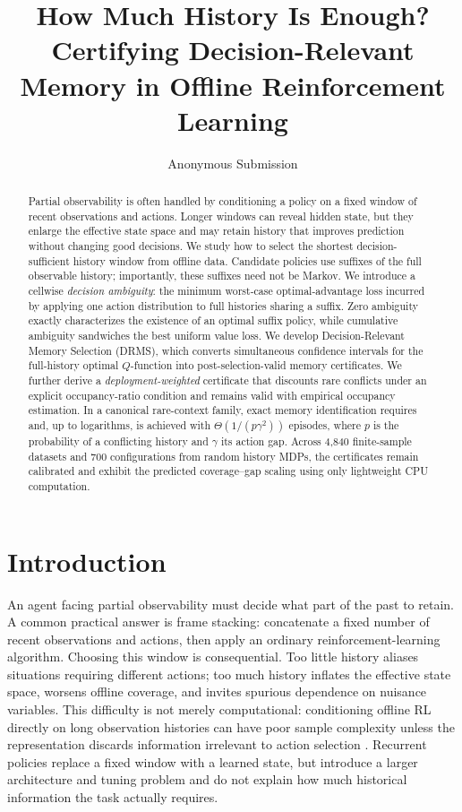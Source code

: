 \documentclass[letterpaper]{article} %
\title{How Much History Is Enough?\\
Certifying Decision-Relevant Memory in Offline Reinforcement Learning}
\author{Anonymous Submission}
\theoremstyle{remark}
\newcommand{\DRMS}{\textnormal{\textsc{DRMS}}}
\begin{document}
\maketitle

\begin{abstract}
Partial observability is often handled by conditioning a policy on a fixed
window of recent observations and actions. Longer windows can reveal hidden
state, but they enlarge the effective state space and may retain history that
improves prediction without changing good decisions. We study how to select
the shortest decision-sufficient history window from offline data. Candidate
policies use suffixes of the full observable history; importantly, these
suffixes need not be Markov. We introduce a cellwise \emph{decision ambiguity}:
the minimum worst-case optimal-advantage loss incurred by applying one action
distribution to full histories sharing a suffix. Zero ambiguity exactly
characterizes the existence of an optimal suffix policy, while cumulative
ambiguity sandwiches the best uniform value loss. We develop
Decision-Relevant Memory Selection (\DRMS), which converts simultaneous
confidence intervals for the full-history optimal $Q$-function into
post-selection-valid memory certificates. We further derive a
\emph{deployment-weighted} certificate that discounts rare conflicts under an
explicit occupancy-ratio condition and remains valid with empirical occupancy
estimation. In a canonical rare-context family, exact memory identification
requires and, up to logarithms, is achieved with
$\Theta(1/(p\gamma^2))$ episodes, where $p$ is the probability of a
conflicting history and $\gamma$ its action gap. Across 4,840 finite-sample
datasets and 700 configurations from random history MDPs, the certificates
remain calibrated and exhibit the predicted coverage--gap scaling using only
lightweight CPU computation.
\end{abstract}

\section{Introduction}

An agent facing partial observability must decide what part of the past to
retain. A common practical answer is frame stacking: concatenate a fixed
number of recent observations and actions, then apply an ordinary
reinforcement-learning algorithm. Choosing this window is consequential. Too
little history aliases situations requiring different actions; too much
history inflates the effective state space, worsens offline coverage, and
invites spurious dependence on nuisance variables. This difficulty is not
merely computational: conditioning offline RL directly on long observation
histories can have poor sample complexity unless the representation discards
information irrelevant to action selection \citep{hong2024histories}.
Recurrent policies replace
a fixed window with a learned state, but introduce a larger architecture and
tuning problem and do not explain how much historical information the task
actually requires.
\end{document}
